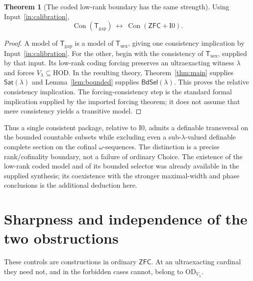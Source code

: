 \documentclass[11pt,letterpaper]{article}
\theoremstyle{definition}
\newtheorem{theorem}[definition]{Theorem}
\newcommand{\ZFC}{\mathsf{ZFC}}
\newcommand{\HOD}{\mathrm{HOD}}
\newcommand{\OD}{\mathrm{OD}}
\newcommand{\Con}{\operatorname{Con}}
\newcommand{\Izero}{\mathrm{I0}}
\numberwithin{equation}{section}
\newcommand{\Sat}{\mathsf{Sat}}
\begin{document}
\begin{theorem}[The coded low-rank boundary has the same strength]\label{thm:gap}
Using Input~\ref{in:calibration},
\begin{equation}
\Con(\mathsf T_{\mathrm{gap}})
\ \longleftrightarrow\
\Con(\ZFC+\Izero).
\label{eq:gap}
\end{equation}
\end{theorem}
\begin{proof}
A model of $\mathsf T_{\mathrm{gap}}$ is a model of $\mathsf T_{\mathrm{uex}}$, giving one consistency implication by Input~\ref{in:calibration}. For the other, begin with the consistency of $\mathsf T_{\mathrm{uex}}$, supplied by that input. Its low-rank coding forcing preserves an ultraexacting witness $\lambda$ and forces $V_\lambda\subseteq\HOD$. In the resulting theory, Theorem~\ref{thm:main} supplies $\Sat(\lambda)$ and Lemma~\ref{lem:bounded} supplies $\mathsf{BdSel}(\lambda)$. This proves the relative consistency implication. The forcing-consistency step is the standard formal implication supplied by the imported forcing theorem; it does not assume that mere consistency yields a transitive model.
\end{proof}

Thus a single consistent package, relative to $\Izero$, admits a definable transversal on the bounded countable subsets while excluding even a sub-$\lambda$-valued definable complete section on the cofinal $\omega$-sequences. The distinction is a precise rank/cofinality boundary, not a failure of ordinary Choice. The existence of the low-rank coded model and of its bounded selector was already available in the supplied synthesis; its coexistence with the stronger maximal-width and phase conclusions is the additional deduction here.

\section{Sharpness and independence of the two obstructions}\label{sec:controls}

These controls are constructions in ordinary $\ZFC$. At an ultraexacting cardinal they need not, and in the forbidden cases cannot, belong to $\OD_{V_\lambda}$.
\end{document}
